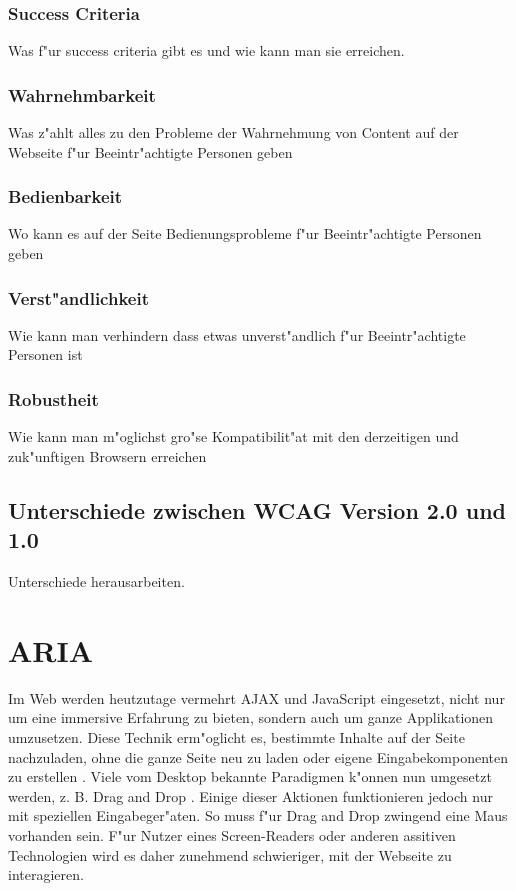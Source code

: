 \documentclass[a4paper,bibtotoc,oneside]{scrbook}
\begin{document}
\subsection{Success Criteria}
Was f"ur success criteria gibt es und wie kann man sie erreichen.

\subsection{Wahrnehmbarkeit}
Was z"ahlt alles zu den Probleme der Wahrnehmung von Content auf der Webseite  f"ur Beeintr"achtigte Personen geben

\subsection{Bedienbarkeit}
Wo kann es auf der Seite Bedienungsprobleme f"ur Beeintr"achtigte Personen geben

\subsection{Verst"andlichkeit}
Wie kann man verhindern dass etwas unverst"andlich  f"ur Beeintr"achtigte Personen ist

\subsection{Robustheit}
Wie kann man m"oglichst gro"se Kompatibilit"at mit den derzeitigen und zuk"unftigen Browsern erreichen

\section{Unterschiede zwischen WCAG Version 2.0 und 1.0}
Unterschiede herausarbeiten.


\chapter{ARIA}
Im Web werden heutzutage vermehrt AJAX und JavaScript eingesetzt, nicht nur um eine immersive Erfahrung zu bieten, sondern auch um ganze Applikationen umzusetzen. Diese Technik erm"oglicht es, bestimmte Inhalte auf der Seite nachzuladen, ohne die ganze Seite neu zu laden oder eigene Eingabekomponenten zu erstellen \cite[S.26]{mod_software}. Viele vom Desktop bekannte Paradigmen k"onnen nun umgesetzt werden, z. B. \glqq Drag and Drop \grqq. Einige dieser Aktionen funktionieren jedoch nur mit speziellen Eingabeger"aten. So muss f"ur Drag and Drop zwingend eine Maus vorhanden sein. F"ur Nutzer eines Screen-Readers oder anderen assitiven Technologien wird es daher zunehmend schwieriger, mit der Webseite zu interagieren. \cite{aria_intro}
\end{document}
